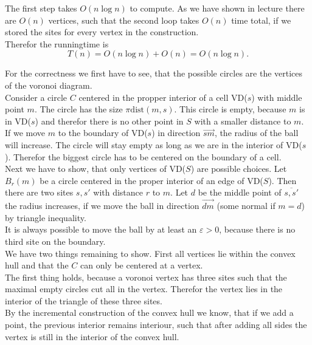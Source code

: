 \documentclass[11pt,a4paper,ngerman]{article}
\begin{document}
The first step takes $O(n \log n)$ to compute. As we have shown in lecture there are $O(n)$ vertices,
such that the second loop takes $O(n)$ time total, if we stored the sites for every vertex in the construction.\\

Therefor the runningtime is
$$ T(n) = O(n \log n) + O(n) = O(n \log n).$$

For the correctness we first have to see, that the possible circles are the vertices of the voronoi diagram.\\
Consider a circle $C$ centered in the propper interior of a cell VD($s$) with middle point $m$. The circle has the size $\pi \text{dist}(m,s)$.
This circle is empty, because $m$ is in VD($s$) and therefor there is no other point in $S$ with a smaller distance to $m$.\\
If we move $m$ to the boundary of VD($s$) in direction $\overrightarrow{sm}$, the radius of the ball will increase. The circle will stay empty
as long as we are in the interior of VD($s$). Therefor the biggest circle has to be centered on the boundary of a cell.\\

Next we have to show, that only vertices of VD($S$) are possible choices. Let $B_r(m)$ be a circle centered in the proper interior of an 
edge of VD($S$). Then there are two sites $s,s'$ with distance $r$ to $m$. Let $d$ be the middle point of $\overline{s,s'}$
the radius increases, if we move the ball in direction $\overrightarrow{dm}$ (some normal if $m = d$) by triangle inequality.\\

It is always possible to move the ball by at least an $\varepsilon > 0$, because there is no third site on the boundary.\\

We have two things remaining to show. First all vertices lie within the convex hull and that the $C$ can only be centered at a vertex.\\
The first thing holds, because a voronoi vertex has three sites such that the maximal empty circles cut all in the vertex. Therefor
the vertex lies in the interior of the triangle of these three sites.\\
By the incremental construction of the convex hull we know, that if we add a point, the previous interior remains interiour, such that
after adding all sides the vertex is still in the interior of the convex hull.\\
\end{document}
